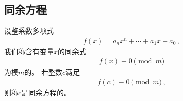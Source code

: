 \subsection*{同余方程}
\begin{definition}
    设整系数多项式
    \begin{align}
        f(x)=a_nx^n+\cdots+a_1x+a_0\, ,
    \end{align}
    我们称含有变量$x$的同余式
    \begin{align}\label{eq:7.ex02.congruenceequation}
        f(x)\equiv0\pmod{m}
    \end{align}
    为模$m$的。
    若整数$c$满足
    \begin{align}
        f(c)\equiv0\pmod{m}\, ,
    \end{align}
    则称$c$是同余方程的。
\end{definition}

